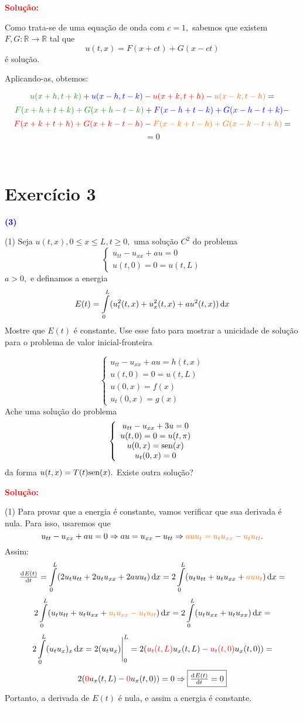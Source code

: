 \documentclass[11pt,a4paper]{article}
\newcommand{\exercicio}[1]{\section*{Exercício #1} \textcolor{blue}{\bf(#1)}}
\newcommand{\dividiritens}[1]{\begin{tasks}[counter-format={(tsk[a])},label-width=3.6ex, label-format = {\bfseries}, column-sep = {0pt}](1) #1 \end{tasks}}
\newcommand{\pers}[1]{\textcolor{Floresta}{$\negrito{(#1)} $}}
\newcommand{\solucao}[1]{\begin{mdframed}[style=MyFrame]
\textbf{\textcolor{red}{Solução:}} #1
\end{mdframed}\textcolor{white}{Oi} \newline}
\begin{document}
\solucao{

Como trata-se de uma equação de onda com $c = 1,$ sabemos que existem $F, G \colon \mathbb{R} \to \mathbb{R}$ tal que
\[u(t,x) = F(x + ct) + G(x - ct)\]
é solução.

Aplicando-as, obtemos:

\[\textcolor{Floresta}{u(x + h, t + k)} + \textcolor{blue}{
u(x - h, t - k)} - \textcolor{red}{u(x + k, t + h)} - \textcolor{Laranja}{u(x - k, t - h)} = \]
\[\textcolor{Floresta}{F(x+h + t+k) + G(x+h-t-k)} + \textcolor{blue}{
F(x - h + t - k) + G(x - h -t + k)} - \]\[\textcolor{red}{F(x + k + t + h) + G(x + k - t - h)} - \textcolor{Laranja}{F(x - k + t - h) + G(x - k - t + h)} = \]\[=0\]}
\exercicio{3}
\dividiritens{
\task[\pers{a}] Seja $u(t,x), 0 \le x \le L, t \ge 0,$ uma solução $C^2$ do problema
\[
\left\{\begin{array}{c}
u_{tt} - u_{xx} + au = 0 \\
u(t,0) = 0 = u(t,L)
\end{array}
\right.
\]
$a > 0,$ e definamos a energia
\[E(t) = \int\limits_0^L (u^2_t(t,x) + u^2_x(t,x) + au^2(t,x)) \dif x
\]
Mostre que $E(t)$ é constante. Use esse fato para mostrar a unicidade de solução para o problema de valor inicial-fronteira

\[
\left\{\begin{array}{c}
u_{tt} - u_{xx} + au = h(t,x) \\
u(t,0) = 0 = u(t,L) \\
u(0, x) = f(x) \\
u_t(0,x)  =g(x)
\end{array}
\right.
\]
\task[\pers{b}] Ache uma solução do problema
\[
\left\{\begin{array}{c}
u_{tt} - u_{xx} + 3u = 0 \\
u(t,0) = 0 = u(t,\pi) \\
u(0, x) = {\rm sen}(x) \\
u_t(0,x)  =0
\end{array}
\right.
\]
da forma $u(t, x) = T(t){\rm sen}(x).$ Existe outra solução?
}

\newpage

\solucao{
\dividiritens{
\task[\pers{a}] 
Para provar que a energia é constante, vamos verificar que sua derivada é nula.
Para isso, usaremos que 
\[u_{tt} - u_{xx} + au = 0  \Rightarrow au = u_{xx} - u_{tt} \Rightarrow \textcolor{Laranja}{au u_t = u_t u_{xx} - u_t u_{tt}}.\]
Assim:
\[\od{E(t)}{t} = \int\limits_0^L (2u_t u_{tt} + 2u_t u_{xx} + 2a u u_t) \dif x = 2 \int\limits_0^L (u_t u_{tt} + u_t u_{xx} + \textcolor{Laranja}{a u u_t}) \dif x =\]\[2 \int\limits_0^L (u_t u_{tt} + u_t u_{xx} + \textcolor{Laranja}{u_t u_{xx} - u_t u_{tt}}) \dif x = 2 \int\limits_0^L ( u_t u_{xx} + u_t u_{xx}) \dif x =   \]\[
2 \int\limits_0^L  (u_t u_x)_x \dif x = 2 (u_t u_x) \Biggr|_{0}^{L} = 2( \textcolor{red}{u_t(t,L)} u_x(t,L) - \textcolor{red}{u_t(t,0)} u_x(t,0)) = \]\[ 2(\textcolor{red}{0} u_x(t,L) - \textcolor{red}{0} u_x(t,0)) = 0 \Rightarrow \boxed{\od{E(t)}{t} = 0}
\]
Portanto, a derivada de $E(t)$ é nula, e assim a energia é constante.
\task[\pers{b}]
}
}
\end{document}
